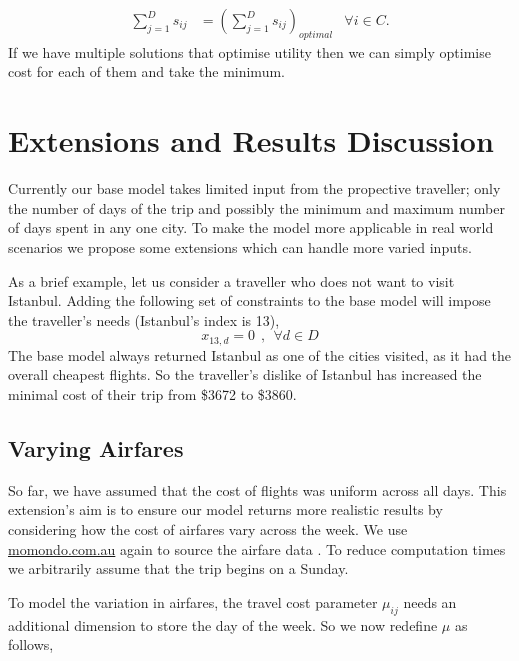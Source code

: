 \documentclass[12pt]{article}
\begin{document}
\begin{align*}
	\sum\limits_{j=1}^D s_{ij} &= (\sum\limits_{j=1}^D s_{ij})_{optimal} & \forall i \in C.
\end{align*}
If we have multiple solutions that optimise utility then we can simply optimise cost for each of them and take the minimum.
\pagebreak


\section{Extensions and Results Discussion} 
\label{sec:extensions}


Currently our base model takes limited input from the propective traveller; only the number of days of the trip and possibly the minimum and maximum number of days spent in any one city. To make the model more applicable in real world scenarios we propose some extensions which can handle more varied inputs.

As a brief example, let us consider a traveller who does not want to visit Istanbul. Adding the following set of constraints to the base model will impose the traveller's needs (Istanbul's index is 13),
$$	x_{13,d} = 0~~,~~ \forall d \in D	$$
The base model always returned Istanbul as one of the cities visited, as it had the overall cheapest flights. So the traveller's dislike of Istanbul has increased the minimal cost of their trip from \$3672 to \$3860.

\subsection{Varying Airfares}
So far, we have assumed that the cost of flights was uniform across all days. This extension's aim is to ensure our model returns more realistic results by considering how the cost of airfares vary across the week. We use \url{momondo.com.au} again to source the airfare data \cite{momondo}. To reduce computation times we arbitrarily assume that the trip begins on a Sunday.

To model the variation in airfares, the travel cost parameter $\mu_{ij}$ needs an additional dimension to store the day of the week. So we now redefine $\mu$ as follows,
\end{document}

